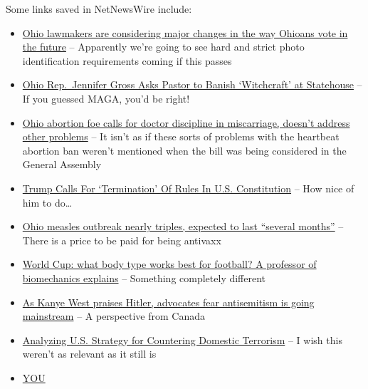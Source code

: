 Some links saved in NetNewsWire include:

\begin{itemize}
\tightlist
\item
  \href{https://www.statenews.org/government-politics/2022-12-06/ohio-lawmakers-are-considering-major-changes-in-the-way-ohioans-vote-in-the-future}{Ohio
  lawmakers are considering major changes in the way Ohioans vote in the
  future} -- Apparently we're going to see hard and strict photo
  identification requirements coming if this passes
\item
  \href{https://www.clevescene.com/news/ohio-rep-jennifer-gross-asks-pastor-to-banish-witchcraft-at-statehouse-40971611}{Ohio
  Rep.~Jennifer Gross Asks Pastor to Banish `Witchcraft' at Statehouse}
  -- If you guessed MAGA, you'd be right!
\item
  \href{https://ohiocapitaljournal.com/2022/12/05/ohio-abortion-foe-calls-for-doctor-discipline-in-miscarriage-doesnt-address-other-problems/}{Ohio
  abortion foe calls for doctor discipline in miscarriage, doesn't
  address other problems} -- It isn't as if these sorts of problems with
  the heartbeat abortion ban weren't mentioned when the bill was being
  considered in the General Assembly
\item
  \href{http://www.newsy.com/stories/fmr-president-trump-calls-for-termination-of-the-u-s-constitution/}{Trump
  Calls For `Termination' Of Rules In U.S. Constitution} -- How nice of
  him to do\ldots{}
\item
  \href{https://arstechnica.com/?p=1901667}{Ohio measles outbreak nearly
  triples, expected to last ``several months''} -- There is a price to
  be paid for being antivaxx
\item
  \href{https://theconversation.com/world-cup-what-body-type-works-best-for-football-a-professor-of-biomechanics-explains-195813}{World
  Cup: what body type works best for football? A professor of
  biomechanics explains} -- Something completely different
\item
  \href{https://www.cbc.ca/news/world/antisemitism-mainsteam-kanye-podcast-1.6671015?cmp=rss}{As
  Kanye West praises Hitler, advocates fear antisemitism is going
  mainstream} -- A perspective from Canada
\item
  \href{https://www.hsdl.org/c/analyzing-u-s-strategy-for-countering-domestic-terrorism/}{Analyzing
  U.S. Strategy for Countering Domestic Terrorism} -- I wish this
  weren't as relevant as it still is
\item
  \href{https://web.archive.org/web/20221207044517/https://twitter.com/mollyjongfast/status/1599867380746059776?s=12&t=YkQ16ahmGq5pMulSc4dD2A}{YOU
}
\end{itemize}
